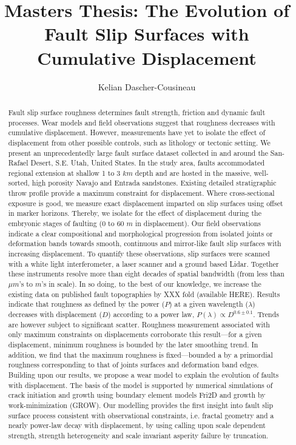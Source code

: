 \documentclass[12pt,a4paper]{article}
\author{Kelian Dascher-Cousineau}
\title{Masters Thesis: The Evolution of Fault Slip Surfaces with Cumulative Displacement}
\begin{document}
\maketitle


\begin{abstract}

Fault slip surface roughness determines fault strength, friction and dynamic fault processes. Wear models and field observations suggest that roughness decreases with cumulative displacement. However, measurements have yet to isolate the effect of displacement from other possible controls, such as lithology or tectonic setting. We present an unprecedentedly large fault surface dataset collected in and around the San-Rafael Desert, S.E. Utah, United States. In the study area, faults accommodated regional extension at shallow 1 to 3 $km$ depth and are hosted in the massive, well-sorted, high porosity Navajo and Entrada sandstones. Existing detailed stratigraphic throw profile provide a maximum constraint for displacement. Where cross-sectional exposure is good, we measure exact displacement imparted on slip surfaces using offset in marker horizons. Thereby, we isolate for the effect of displacement during the embryonic stages of faulting (0 to 60 $m$ in displacement). Our field observations indicate a clear compositional and morphological progression from isolated joints or deformation bands towards smooth, continuous and mirror-like fault slip surfaces with increasing displacement. To quantify these observations, slip surfaces were scanned with a white light interferometer, a laser scanner and a ground based Lidar. Together these instruments resolve more than eight decades of spatial bandwidth (from less than $\mu m$'s to $m$'s in scale). In so doing, to the best of our knowledge, we increase the existing data on published fault topographies by XXX fold (available HERE). Results indicate that roughness as defined by the power ($P$) at a given wavelength ($\lambda$) decreases with displacement ($D$) according to a power law, $P(\lambda) \varpropto D^{0.6 \pm 0.1}$. Trends are however subject to significant scatter. Roughness measurement associated with only maximum constraints on displacements corroborate this result—for a given displacement, minimum roughness is bounded by the later smoothing trend. In addition, we find that the maximum roughness is fixed—bounded a by a primordial roughness corresponding to that of joints surfaces and deformation band edges. Building upon our results, we propose a wear model to explain the evolution of faults with displacement. The basis of the model is supported by numerical simulations of crack initiation and growth using boundary element models Fri2D and growth by work-minimization (GROW). Our modelling provides the first insight into fault slip surface process consistent with observational constraints, i.e. fractal geometry and a nearly power-law decay with displacement, by using calling upon scale dependent strength, strength heterogeneity and scale invariant asperity failure by truncation.

\end{abstract}
\end{document}
